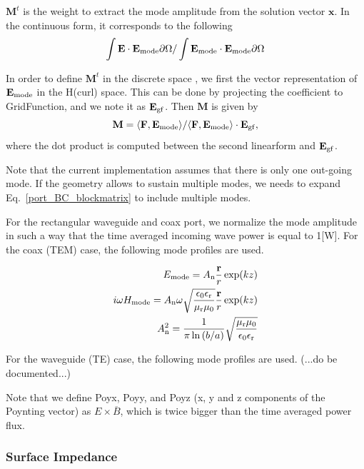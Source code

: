 \documentclass[11pt,a4paper,final]{report}
\begin{document}
$\mathbf{M}^t$ is the weight to extract the mode amplitude from the solution vector $\mathbf{x}$. In the continuous form, it corresponds to the following 
\begin{equation}
\int \mathbf{E} \cdot \mathbf{E}_{\rm mode} \partial\Omega/\int \mathbf{E}_{\rm mode}  \cdot \mathbf{E}_{\rm mode} \partial\Omega
\end{equation}

In order to define $\mathbf{M}^t$ in the discrete space , we first the vector representation of $\mathbf{E}_{\rm mode}$ in the H(curl) space. This can be done by projecting the coefficient to GridFunction, and we note it as $\mathbf{E}_{\rm gf}$. Then $\mathbf{M}$ is given by
\begin{equation}
\mathbf{M} = \langle \mathbf{F}, \mathbf{E_{\rm mode}} \rangle / \langle \mathbf{F}, \mathbf{E}_{\rm mode} \rangle \cdot \mathbf{E}_{\rm gf},
 \end{equation}
where the dot product is computed between the second linearform and $\mathbf{E}_{\rm gf}$.

Note that the current implementation assumes that there is only one out-going mode. If the geometry allows to sustain multiple modes, we needs to expand Eq.~\ref{port_BC_blockmatrix} to include multiple modes. 

For the rectangular waveguide and coax port, we normalize the mode amplitude in such a way that the time averaged  incoming wave power is equal to 1[W]. For the coax (TEM) case, the following mode profiles are used.

 \begin{align}
E_{\rm mode} = A_{\rm n} \frac{\mathbf{r}}{r} \exp(kz)
\\
i \omega H_{\rm mode} = A_{\rm n} \omega \sqrt{\frac{\epsilon_{\rm 0}\epsilon_{\rm r}}{\mu_{\rm r}\mu_{\rm 0}}} \frac{\mathbf{r}}{r} \exp(kz)
\\
 A_{\rm n}^2 = \frac{1}{\pi \ln{(b/a)}} \sqrt{\frac{\mu_{\rm r}\mu_{\rm 0}}{\epsilon_{\rm 0}\epsilon_{\rm r}}}
\end{align}

For the waveguide (TE) case, the following mode profiles are used.
(...do be documented...)

Note that we define Poyx, Poyy, and Poyz (x, y and z components of the Poynting vector) as $E \times \overline{B}$, which is twice bigger than the time averaged power flux.

 \subsubsection{Surface Impedance}
 
\end{document}

